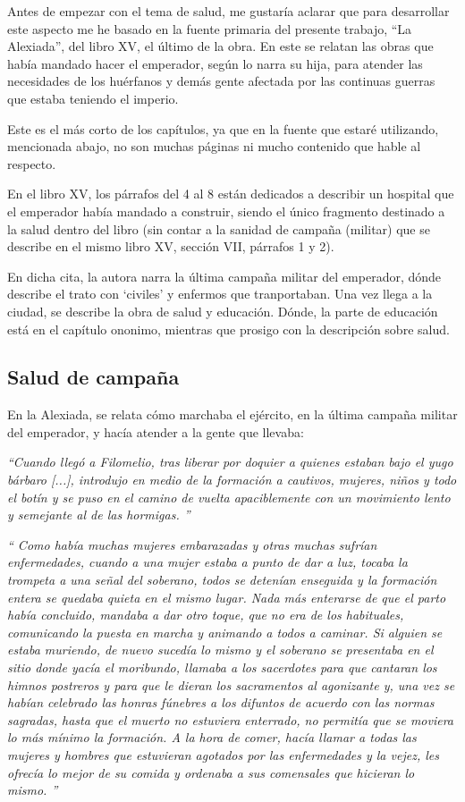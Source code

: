 
Antes de empezar con el tema de salud, me gustaría aclarar que
para desarrollar este aspecto me he basado en
la fuente primaria del 
presente trabajo, “La Alexiada”, del libro XV, el último de la obra. 
En este se relatan
las obras que había mandado hacer el emperador, 
según lo narra su hija, para atender las necesidades de
los huérfanos y demás gente afectada 
por las continuas guerras que estaba teniendo el imperio.

Este es el más corto de los capítulos, ya que en la fuente
que estaré utilizando, mencionada abajo, no son muchas
páginas ni mucho contenido que hable al respecto.

En el libro XV, los párrafos del 4 al 8 están dedicados a 
describir un hospital que el emperador había mandado a construir, 
siendo el único fragmento destinado a la salud dentro del libro 
(sin contar a la sanidad de campaña (militar) que se describe 
en el mismo libro XV, sección VII, párrafos 1 y 2).

En dicha cita, la autora narra la última campaña militar
del emperador, dónde describe el trato con `civiles' y
enfermos que tranportaban. Una vez llega a la ciudad,
se describe la obra de salud y educación.
Dónde, la parte de educación está en el capítulo ononimo,
mientras que prosigo con la descripción sobre salud.

\subsection{Salud de campaña}
En la Alexiada, se relata cómo marchaba el ejército, en la
última campaña militar del emperador, y hacía atender
a la gente que llevaba:

\textit{``Cuando llegó a Filomelio, tras liberar por doquier
	a quienes estaban bajo el yugo bárbaro [...], introdujo
	en medio de la formación a cautivos, mujeres, niños y
	todo el botín y se puso en el camino de vuelta apaciblemente
	con un movimiento lento y semejante al de las hormigas.
	''}

\textit{``
	Como había muchas mujeres embarazadas y otras muchas sufrían
	enfermedades, cuando a una mujer estaba a punto de dar a luz,
	tocaba la trompeta a una señal del soberano, todos se detenían
	enseguida y la formación entera se quedaba quieta en el mismo
	lugar. Nada más enterarse de que el parto había concluido,
	mandaba a dar otro toque, que no era de los habituales,
	comunicando la puesta en marcha y animando a todos a caminar.
	Si alguien se estaba muriendo, de nuevo sucedía lo mismo y el
	soberano se presentaba en el sitio donde yacía el moribundo,
	llamaba a los sacerdotes para que cantaran los himnos postreros
	y para que le dieran los sacramentos al agonizante y, una vez se
	habían celebrado las honras fúnebres a los difuntos de acuerdo
	con las normas sagradas, hasta que el muerto no estuviera enterrado,
	no permitía que se moviera lo más mínimo la formación. A la hora de comer,
	hacía llamar a todas las mujeres y hombres que estuvieran agotados
	por las enfermedades y la vejez, les ofrecía lo mejor de su comida
	y ordenaba a sus comensales que hicieran lo mismo.
	''}

